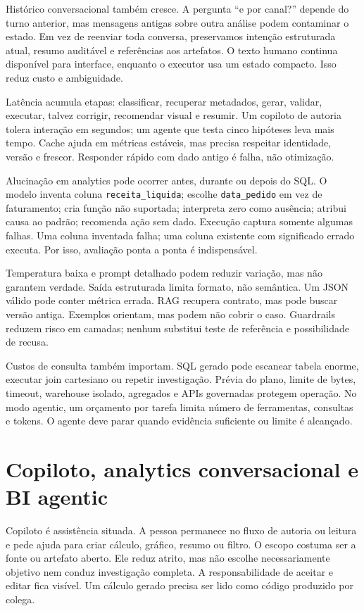 Histórico conversacional também cresce. A pergunta ``e por canal?'' depende do turno anterior, mas mensagens antigas sobre outra análise podem contaminar o estado. Em vez de reenviar toda conversa, preservamos intenção estruturada atual, resumo auditável e referências aos artefatos. O texto humano continua disponível para interface, enquanto o executor usa um estado compacto. Isso reduz custo e ambiguidade.

Latência acumula etapas: classificar, recuperar metadados, gerar, validar, executar, talvez corrigir, recomendar visual e resumir. Um copiloto de autoria tolera interação em segundos; um agente que testa cinco hipóteses leva mais tempo. Cache ajuda em métricas estáveis, mas precisa respeitar identidade, versão e frescor. Responder rápido com dado antigo é falha, não otimização.

Alucinação em analytics pode ocorrer antes, durante ou depois do SQL. O modelo inventa coluna \texttt{receita\_liquida}; escolhe \texttt{data\_pedido} em vez de faturamento; cria função não suportada; interpreta zero como ausência; atribui causa ao padrão; recomenda ação sem dado. Execução captura somente algumas falhas. Uma coluna inventada falha; uma coluna existente com significado errado executa. Por isso, avaliação ponta a ponta é indispensável.

Temperatura baixa e prompt detalhado podem reduzir variação, mas não garantem verdade. Saída estruturada limita formato, não semântica. Um JSON válido pode conter métrica errada. RAG recupera contrato, mas pode buscar versão antiga. Exemplos orientam, mas podem não cobrir o caso. Guardrails reduzem risco em camadas; nenhum substitui teste de referência e possibilidade de recusa.

Custos de consulta também importam. SQL gerado pode escanear tabela enorme, executar join cartesiano ou repetir investigação. Prévia do plano, limite de bytes, timeout, warehouse isolado, agregados e APIs governadas protegem operação. No modo agentic, um orçamento por tarefa limita número de ferramentas, consultas e tokens. O agente deve parar quando evidência suficiente ou limite é alcançado.

\section{Copiloto, analytics conversacional e BI agentic}

Copiloto é assistência situada. A pessoa permanece no fluxo de autoria ou leitura e pede ajuda para criar cálculo, gráfico, resumo ou filtro. O escopo costuma ser a fonte ou artefato aberto. Ele reduz atrito, mas não escolhe necessariamente objetivo nem conduz investigação completa. A responsabilidade de aceitar e editar fica visível. Um cálculo gerado precisa ser lido como código produzido por colega.

